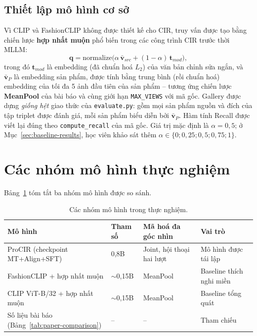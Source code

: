 \subsection{Thiết lập mô hình cơ sở}\label{sec:baseline-setup}

Vì CLIP và FashionCLIP không được thiết kế cho CIR, truy vấn được tạo bằng chiến lược \textbf{hợp nhất muộn} phổ biến trong các công trình CIR trước thời MLLM:
\begin{equation}
    \mathbf{q} = \mathrm{normalize}\big(\alpha\, \bar{\mathbf{v}}_{src} + (1 - \alpha)\, \mathbf{t}_{mod}\big),
    \label{eq:late-fusion}
\end{equation}
trong đó $\mathbf{t}_{mod}$ là embedding (đã chuẩn hoá $L_2$) của văn bản chỉnh sửa ngắn, và $\bar{\mathbf{v}}_{P}$ là embedding sản phẩm, được tính bằng trung bình (rồi chuẩn hoá) embedding của tối đa 5 ảnh đầu tiên của sản phẩm -- tương ứng chiến lược \textbf{MeanPool} của bài báo và cùng giới hạn \texttt{MAX\_VIEWS} với mã gốc. Gallery được dựng \emph{giống hệt} giao thức của \texttt{evaluate.py}: gồm mọi sản phẩm nguồn và đích của tập triplet được đánh giá, mỗi sản phẩm biểu diễn bởi $\bar{\mathbf{v}}_P$. Hàm tính Recall được viết lại đúng theo \texttt{compute\_recall} của mã gốc. Giá trị mặc định là $\alpha = 0{,}5$; ở Mục~\ref{sec:baseline-results}, học viên khảo sát thêm $\alpha \in \{0; 0{,}25; 0{,}5; 0{,}75; 1\}$.

\section{Các nhóm mô hình thực nghiệm}\label{sec:model-groups}

Bảng~\ref{tab:model-groups} tóm tắt ba nhóm mô hình được so sánh.

\begin{table}[h]
\centering
\caption{Các nhóm mô hình trong thực nghiệm.}
\label{tab:model-groups}
\small
\begin{tabular}{p{3.3cm}p{2.2cm}p{3.4cm}p{4.2cm}}
\toprule
Mô hình & Tham số & Mã hoá đa góc nhìn & Vai trò \\
\midrule
ProCIR (checkpoint MT+Align+SFT) & 0,8B & Joint, hội thoại hai lượt & Mô hình được tái lập \\
FashionCLIP + hợp nhất muộn & $\sim$0,15B & MeanPool & Baseline thích nghi miền \\
CLIP ViT-B/32 + hợp nhất muộn & $\sim$0,15B & MeanPool & Baseline tổng quát \\
Số liệu bài báo (Bảng~\ref{tab:paper-comparison}) & -- & -- & Tham chiếu \\
\bottomrule
\end{tabular}
\end{table}

